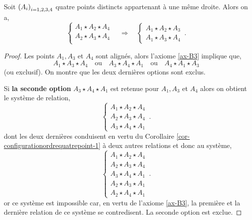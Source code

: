 \begin{cor}\label{cor-configurationordrequatrepoint-2}
Soit $\left(A_{i}\right)_{i = 1,2,3,4}$ quatre points distincts appartenant à une même droite. Alors on a,
        \begin{equation*}
        \left\{
            \begin{array}{c}
                 A_{1} \star A_{2} \star A_{4} \\
                 A_{2} \star A_{3} \star A_{4}\\
            \end{array}
            \right. \quad \Longrightarrow \quad \left\{
            \begin{array}{c}
                A_1 \star A_2 \star A_3\\
                A_1 \star A_3 \star A_4
            \end{array}
            \right.\,.
    \end{equation*}
    \begin{proof}
        Les points $A_1,A_3$ et $A_4$ sont alignés, alors l'axiome \ref{ax-B3} implique que,
        \begin{equation*}
            A_1 \star A_3 \star A_4 \quad\text{ou}\quad A_3 \star A_4 \star A_1 \quad\text{ou}\quad A_4 \star A_1 \star A_3 
        \end{equation*}
        (ou exclusif). On montre que les deux dernières options sont exclus. 

        Si \textbf{la seconde option} $A_3 \star A_4 \star A_1$ est retenue pour $A_1,A_3$ et $A_4$ alors on obtient le système de relation,
        \begin{equation*}
        \left\{
            \begin{array}{c}
                 A_1 \star A_2 \star A_4 \\
                 A_2 \star A_3 \star A_4 \\
                 A_3 \star A_4 \star A_1 
            \end{array}
            \right. \,.
        \end{equation*}
        dont les deux dernières conduisent en vertu du Corollaire \ref{cor-configurationordrequatrepoint-1} à deux autres relations et donc au système,
        \begin{equation*}
        \left\{
            \begin{array}{c}
                 A_1 \star A_2 \star A_4 \\
                 A_2 \star A_3 \star A_4 \\
                 A_3 \star A_4 \star A_1 \\
                 A_2 \star A_3 \star A_1 \\
                 A_2 \star A_4 \star A_1 
            \end{array}
            \right. \,.
        \end{equation*}
        or ce système est impossible car, en vertu de l'axiome \ref{ax-B3}, la première et la dernière relation de ce système se contredisent. La seconde option est exclue.


\end{proof}
\end{cor}
